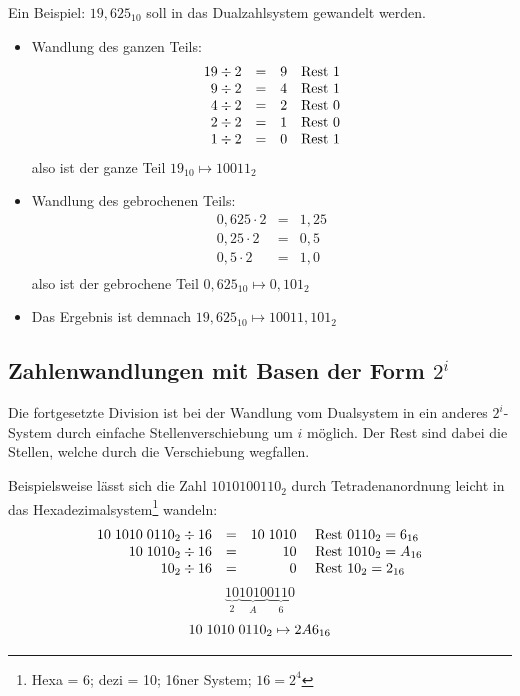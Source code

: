 \documentclass[11pt,a4paper]{scrreprt}
\begin{document}
Ein Beispiel: $19,625_{10}$ soll in das Dualzahlsystem gewandelt werden.
\begin{itemize}
\item
	Wandlung des ganzen Teils:
	$$ \begin{array}{rrrl}
		19 \div 2 & = & 9 & \textnormal{Rest } 1 \\
		 9 \div 2 & = & 4 & \textnormal{Rest } 1 \\
		 4 \div 2 & = & 2 & \textnormal{Rest } 0 \\
		 2 \div 2 & = & 1 & \textnormal{Rest } 0 \\
		 1 \div 2 & = & 0 & \textnormal{Rest } 1 \\
	\end{array} $$
	also ist der ganze Teil $19_{10} \mapsto 10011_2$
\item
	Wandlung des gebrochenen Teils:
	$$ \begin{array}{rrrl}
		0,625 \cdot 2 & = & 1,25 \\
		 0,25 \cdot 2 & = & 0,5  \\
		  0,5 \cdot 2 & = & 1,0  \\
	\end{array} $$
	also ist der gebrochene Teil $0,625_{10} \mapsto 0,101_2$
\item
	Das Ergebnis ist demnach  $19,625_{10} \mapsto 10011,101_2$ 
\end{itemize}

\subsection{Zahlenwandlungen mit Basen der Form $2^i$}
Die fortgesetzte Division ist bei der Wandlung vom Dualsystem in ein anderes $2^i$-System durch einfache Stellenverschiebung um $i$ möglich. Der Rest sind dabei die Stellen, welche durch die Verschiebung wegfallen.

Beispielsweise lässt sich die Zahl $1010100110_2$ durch Tetradenanordnung leicht in das Hexadezimalsystem\footnote{Hexa = 6; dezi = 10; 16ner System; $16 = 2^4$} wandeln:
$$
\begin{array}{rrrl}
	10\hspace{1mm}1010\hspace{1mm}0110_2 \div 16 & = & 10\hspace{1mm}1010 
		& \textnormal{ Rest } 0110_2 = 6_{16} \\
	10\hspace{1mm}1010_2 \div 16 & = & 10 
		& \textnormal{ Rest } 1010_2 = A_{16} \\
	10_2 \div 16 & = & 0 
		& \textnormal{ Rest } 10_2 = 2_{16} \\
\end{array}
$$
$$
	\underbrace{10}_{2} \underbrace{1010}_{A} \underbrace{0110}_{6}
$$
$$
	10\hspace{1mm}1010\hspace{1mm}0110_2 \mapsto 2A6_{16}
$$
\end{document}
